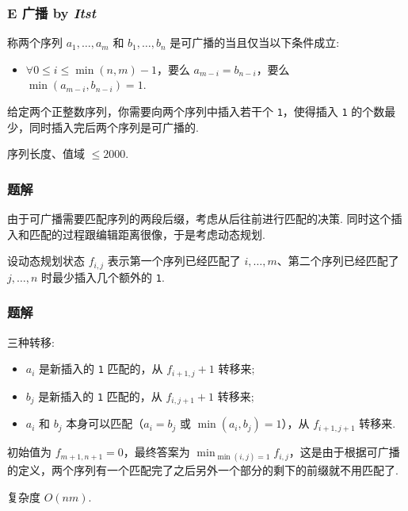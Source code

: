 \frame
{
  \frametitle{E 广播 {by \itshape Itst}}

 	称两个序列 $a_1,\dots,a_m$ 和 $b_1,\dots,b_n$ 是可广播的当且仅当以下条件成立:
	\begin{itemize}
	\item $\forall 0\le i\le \min(n,m)-1$，要么 $a_{m-i}=b_{n-i}$，要么 $\min(a_{m-i},b_{n-i})=1$.
	\end{itemize}

	给定两个正整数序列，你需要向两个序列中插入若干个 \texttt{1}，使得插入 \texttt{1} 的个数最少，同时插入完后两个序列是可广播的.

	序列长度、值域 $\le 2000$.

}
\frame
{
  \frametitle{题解}

 	由于可广播需要匹配序列的两段后缀，考虑从后往前进行匹配的决策. 同时这个插入和匹配的过程跟编辑距离很像，于是考虑动态规划.

	设动态规划状态 $f_{i,j}$  表示第一个序列已经匹配了 $i,\dots,m$、第二个序列已经匹配了 $j,\dots,n$ 时最少插入几个额外的 \texttt{1}.

}

\frame
{
  \frametitle{题解}

	三种转移:
	\begin{itemize}
	\item $a_i$ 是新插入的 \texttt{1} 匹配的，从 $f_{i+1,j}+1$ 转移来;
	\item $b_j$ 是新插入的 \texttt{1} 匹配的，从 $f_{i,j+1}+1$ 转移来;
	\item $a_i$ 和 $b_j$ 本身可以匹配（$a_i=b_j$ 或 $\min(a_i,b_j)=1$），从 $f_{i+1,j+1}$ 转移来.
	\end{itemize}

	初始值为 $f_{m+1,n+1}=0$，最终答案为 $\min_{\min(i,j)=1} f_{i,j}$，这是由于根据可广播的定义，两个序列有一个匹配完了之后另外一个部分的剩下的前缀就不用匹配了.

	复杂度 $O(nm)$.

}